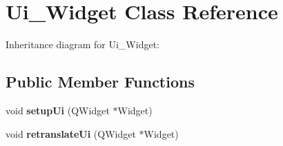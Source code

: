 \hypertarget{classUi__Widget}{}\section{Ui\+\_\+\+Widget Class Reference}
\label{classUi__Widget}


Inheritance diagram for Ui\+\_\+\+Widget\+:
\subsection*{Public Member Functions}
\begin{DoxyCompactItemize}
\item 
\mbox{\label{classUi__Widget_a9039ed8704971418cbe19ef8c9eea266}} 
void {\bfseries setup\+Ui} (Q\+Widget $\ast$Widget)
\item 
\mbox{\label{classUi__Widget_ae1cb85db8d3658df8dcd104361edcecb}} 
void {\bfseries retranslate\+Ui} (Q\+Widget $\ast$Widget)
\end{DoxyCompactItemize}
